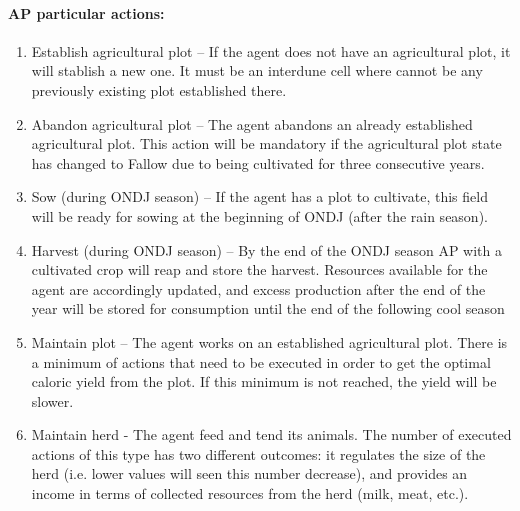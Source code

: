 \paragraph {AP particular actions:}
\begin{enumerate}
\item Establish agricultural plot – If the agent does not have an agricultural plot, it will
stablish a new one. It must be an interdune cell where cannot be any previously
existing plot established there.
\item Abandon agricultural plot – The agent abandons an already established agricultural
plot. This action will be mandatory if the agricultural plot state has changed to Fallow
due to being cultivated for three consecutive years.
\item Sow (during ONDJ season) – If the agent has a plot to cultivate, this field will be ready
for sowing at the beginning of ONDJ (after the rain season).
\item Harvest (during ONDJ season) – By the end of the ONDJ season AP with a cultivated
crop will reap and store the harvest. Resources available for the agent are accordingly
updated, and excess production after the end of the year will be stored for
consumption until the end of the following cool season
\item Maintain plot – The agent works on an established agricultural plot. There is a
minimum of actions that need to be executed in order to get the optimal caloric yield
from the plot. If this minimum is not reached, the yield will be slower.
\item Maintain herd - The agent feed and tend its animals. The number of executed actions
of this type has two different outcomes: it regulates the size of the herd (i.e. lower
values will seen this number decrease), and provides an income in terms of collected
resources from the herd (milk, meat, etc.).
\end{enumerate}



